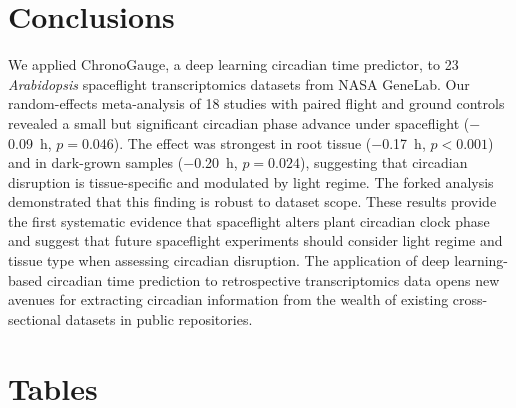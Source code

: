 \documentclass[11pt,a4paper]{article}
\begin{document}
\section*{Conclusions}

We applied ChronoGauge, a deep learning circadian time predictor, to 23 \textit{Arabidopsis} spaceflight transcriptomics datasets from NASA GeneLab. Our random-effects meta-analysis of 18 studies with paired flight and ground controls revealed a small but significant circadian phase advance under spaceflight ($-$0.09~h, $p = 0.046$). The effect was strongest in root tissue ($-$0.17~h, $p < 0.001$) and in dark-grown samples ($-$0.20~h, $p = 0.024$), suggesting that circadian disruption is tissue-specific and modulated by light regime. The forked analysis demonstrated that this finding is robust to dataset scope. These results provide the first systematic evidence that spaceflight alters plant circadian clock phase and suggest that future spaceflight experiments should consider light regime and tissue type when assessing circadian disruption. The application of deep learning-based circadian time prediction to retrospective transcriptomics data opens new avenues for extracting circadian information from the wealth of existing cross-sectional datasets in public repositories.

\section*{Tables}
\end{document}
